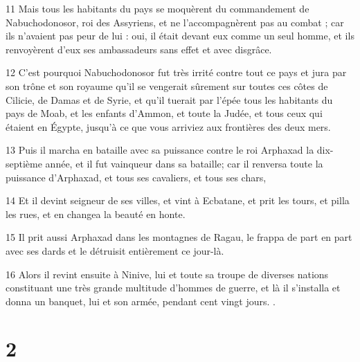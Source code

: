\par 11 Mais tous les habitants du pays se moquèrent du commandement de Nabuchodonosor, roi des Assyriens, et ne l'accompagnèrent pas au combat ; car ils n'avaient pas peur de lui : oui, il était devant eux comme un seul homme, et ils renvoyèrent d'eux ses ambassadeurs sans effet et avec disgrâce.
\par 12 C'est pourquoi Nabuchodonosor fut très irrité contre tout ce pays et jura par son trône et son royaume qu'il se vengerait sûrement sur toutes ces côtes de Cilicie, de Damas et de Syrie, et qu'il tuerait par l'épée tous les habitants du pays de Moab, et les enfants d'Ammon, et toute la Judée, et tous ceux qui étaient en Égypte, jusqu'à ce que vous arriviez aux frontières des deux mers.
\par 13 Puis il marcha en bataille avec sa puissance contre le roi Arphaxad la dix-septième année, et il fut vainqueur dans sa bataille; car il renversa toute la puissance d'Arphaxad, et tous ses cavaliers, et tous ses chars,
\par 14 Et il devint seigneur de ses villes, et vint à Ecbatane, et prit les tours, et pilla les rues, et en changea la beauté en honte.
\par 15 Il prit aussi Arphaxad dans les montagnes de Ragau, le frappa de part en part avec ses dards et le détruisit entièrement ce jour-là.
\par 16 Alors il revint ensuite à Ninive, lui et toute sa troupe de diverses nations constituant une très grande multitude d'hommes de guerre, et là il s'installa et donna un banquet, lui et son armée, pendant cent vingt jours. .

\chapter{2}


